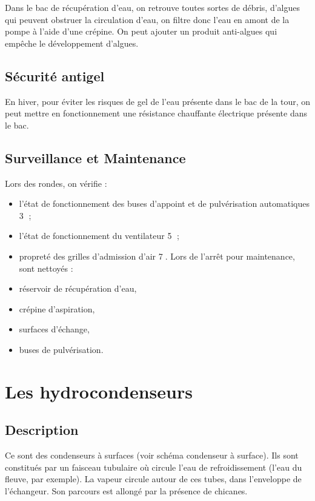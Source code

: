 Dans le bac de récupération d’eau, on retrouve toutes sortes de débris, d’algues qui peuvent obstruer la circulation d’eau, on filtre donc l’eau en amont de la pompe à l’aide d’une crépine. On peut ajouter un produit anti-algues qui empêche le développement d’algues.

\subsection{Sécurité antigel}


En hiver, pour éviter les risques de gel de l’eau présente dans le bac de la tour, on peut mettre en fonctionnement une résistance chauffante électrique présente dans le bac.


\subsection{Surveillance et Maintenance}

Lors des rondes, on vérifie :
\begin{itemize}

\item l'état de fonctionnement des buses d'appoint et de pulvérisation automatiques \textcircled{3} ; 
\item l'état de fonctionnement du ventilateur \textcircled{5} ;
\item propreté des grilles d'admission d'air \textcircled{7}.
Lors de l'arrêt pour maintenance, sont nettoyés :
\item réservoir de récupération d'eau,
\item crépine d'aspiration,
\item surfaces d'échange,
\item buses de pulvérisation.
 \end{itemize}

\section{Les hydrocondenseurs}

\subsection{Description}   

Ce sont des condenseurs à surfaces (voir schéma condenseur à surface). Ils sont constitués par un faisceau tubulaire où circule l’eau de refroidissement (l’eau du fleuve, par exemple). La vapeur circule autour de ces tubes, dans l’enveloppe de l’échangeur. Son parcours est allongé par la présence de chicanes. 
\vspace{0.3cm}

